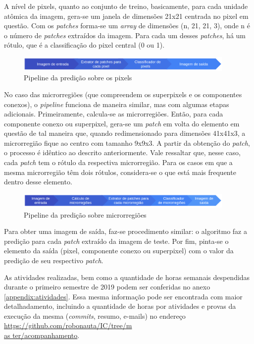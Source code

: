 \documentclass{article}
\begin{document}
		A nível de pixels, quanto ao conjunto de treino, basicamente, para cada unidade atômica da imagem, gera-se um janela de dimensões 21x21 centrada no pixel em questão. Com os \textit{patches} forma-se um \textit{array} de dimensões (n, 21, 21, 3), onde n é o número de \textit{patches} extraídos da imagem. Para cada um desses \textit{patches}, há um rótulo, que é a classificação do pixel central (0 ou 1). 
		
		\begin{figure}[H]			
			\caption[Pipeline da predição sobre os pixels]{Pipeline da predição sobre os pixels}
			\centering
			\includegraphics[width=400px]{13.png}			
		\end{figure}
		
		No caso das microrregiões (que compreendem os superpixels e os componentes conexos), o \textit{pipeline} funciona de maneira similar, mas com algumas etapas adicionais. Primeiramente, calcula-se as microrregiões. Então, para cada componente conexo ou superpixel, gera-se um \textit{patch} em volta do elemento em questão de tal maneira que, quando redimensionado para dimensões 41x41x3, a microrregião fique ao centro com tamanho 9x9x3. A partir da obtenção do \textit{patch}, o processo é idêntico ao descrito anteriormente. Vale ressaltar que, nesse caso, cada \textit{patch}	tem o rótulo da respectiva microrregião. Para os casos em que a mesma microrregião têm dois rótulos, considera-se o que está mais frequente dentro desse elemento. 
		
		\begin{figure}[H]			
			\caption[Pipeline da predição sobre microrregiões]{Pipeline da predição sobre microrregiões}
			\centering
			\includegraphics[width=400px]{14.png}			
		\end{figure}
		
		Para obter uma imagem de saída, faz-se procedimento similar: o algoritmo faz a predição para cada \textit{patch} extraído da imagem de teste. Por fim, pinta-se o elemento da saída (pixel, componente conexo ou superpixel) com o valor da predição de seu respectivo \textit{patch}.
		
		As atividades realizadas, bem como a quantidade de horas semanais despendidas durante o primeiro semestre de 2019 podem ser conferidas no anexo \ref{appendix:atividades}. Essa mesma informação pode ser encontrada com maior detalhadamento, incluindo a quantidade de horas por atividades e provas da execução da mesma (\textit{commits}, resumo, e-mails) no endereço \href{https://github.com/robonauta/IC/tree/master/acompanhamento}{https://github.com/robonauta/IC/tree/m\\as ter/acompanhamento}.
		
\end{document}
